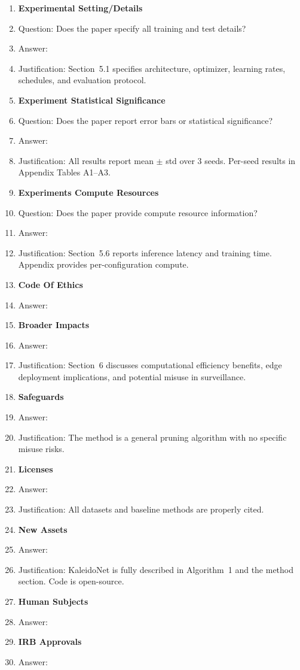 \documentclass[10pt]{article}
\begin{document}
\begin{enumerate}
\item {\bf Experimental Setting/Details}
\item[] Question: Does the paper specify all training and test details?
\item[] Answer: \answerYes{}
\item[] Justification: Section~5.1 specifies architecture, optimizer, learning rates, schedules, and evaluation protocol.

\item {\bf Experiment Statistical Significance}
\item[] Question: Does the paper report error bars or statistical significance?
\item[] Answer: \answerYes{}
\item[] Justification: All results report mean $\pm$ std over 3 seeds. Per-seed results in Appendix Tables A1--A3.

\item {\bf Experiments Compute Resources}
\item[] Question: Does the paper provide compute resource information?
\item[] Answer: \answerYes{}
\item[] Justification: Section~5.6 reports inference latency and training time. Appendix provides per-configuration compute.

\item {\bf Code Of Ethics}
\item[] Answer: \answerYes{}

\item {\bf Broader Impacts}
\item[] Answer: \answerYes{}
\item[] Justification: Section~6 discusses computational efficiency benefits, edge deployment implications, and potential misuse in surveillance.

\item {\bf Safeguards}
\item[] Answer: \answerNA{}
\item[] Justification: The method is a general pruning algorithm with no specific misuse risks.

\item {\bf Licenses}
\item[] Answer: \answerYes{}
\item[] Justification: All datasets and baseline methods are properly cited.

\item {\bf New Assets}
\item[] Answer: \answerYes{}
\item[] Justification: KaleidoNet is fully described in Algorithm~1 and the method section. Code is open-source.

\item {\bf Human Subjects}
\item[] Answer: \answerNo{}

\item {\bf IRB Approvals}
\item[] Answer: \answerNA{}
\end{enumerate}
\end{document}
